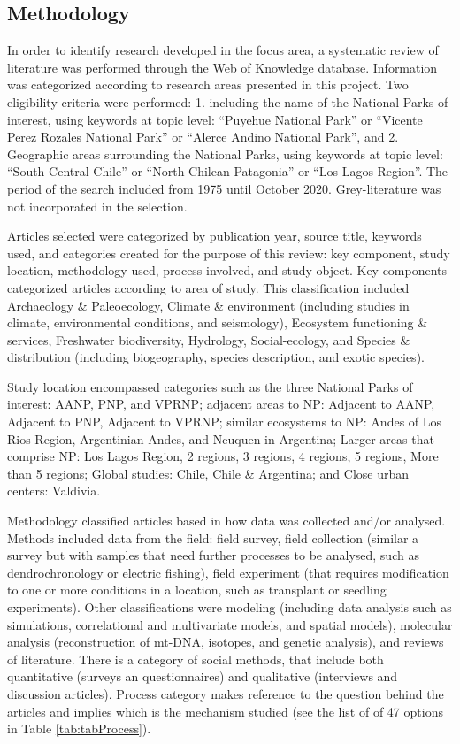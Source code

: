 \documentclass[]{article}
\begin{document}
\hypertarget{methodology}{%
\subsection{Methodology}\label{methodology}}

In order to identify research developed in the focus area, a systematic review of literature was performed through the Web of Knowledge database. Information was categorized according to research areas presented in this project.
Two eligibility criteria were performed: 1. including the name of the National Parks of interest, using keywords at topic level: ``Puyehue National Park'' or ``Vicente Perez Rozales National Park'' or ``Alerce Andino National Park'', and 2. Geographic areas surrounding the National Parks, using keywords at topic level: ``South Central Chile'' or ``North Chilean Patagonia'' or ``Los Lagos Region''. The period of the search included from 1975 until October 2020. Grey-literature was not incorporated in the selection.

Articles selected were categorized by publication year, source title, keywords used, and categories created for the purpose of this review: key component, study location, methodology used, process involved, and study object.
Key components categorized articles according to area of study. This classification included Archaeology \& Paleoecology, Climate \& environment (including studies in climate, environmental conditions, and seismology), Ecosystem functioning \& services, Freshwater biodiversity, Hydrology, Social-ecology, and Species \& distribution (including biogeography, species description, and exotic species).

Study location encompassed categories such as the three National Parks of interest: AANP, PNP, and VPRNP; adjacent areas to NP: Adjacent to AANP, Adjacent to PNP, Adjacent to VPRNP; similar ecosystems to NP: Andes of Los Rios Region, Argentinian Andes, and Neuquen in Argentina; Larger areas that comprise NP: Los Lagos Region, 2 regions, 3 regions, 4 regions, 5 regions, More than 5 regions; Global studies: Chile, Chile \& Argentina; and Close urban centers: Valdivia.

Methodology classified articles based in how data was collected and/or analysed.
Methods included data from the field: field survey, field collection (similar a survey but with samples that need further processes to be analysed, such as dendrochronology or electric fishing), field experiment (that requires modification to one or more conditions in a location, such as transplant or seedling experiments).
Other classifications were modeling (including data analysis such as simulations, correlational and multivariate models, and spatial models), molecular analysis (reconstruction of mt-DNA, isotopes, and genetic analysis), and reviews of literature.
There is a category of social methods, that include both quantitative (surveys an questionnaires) and qualitative (interviews and discussion articles).
Process category makes reference to the question behind the articles and implies which is the mechanism studied (see the list of of 47 options in Table \ref{tab:tabProcess}).
\end{document}

